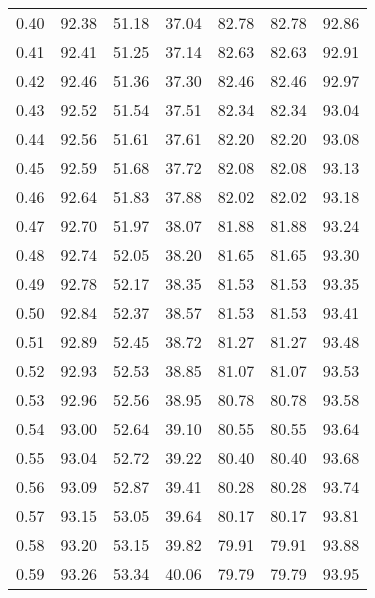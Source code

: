 \begin{tabular}{|c|c|c|c|c|c|c|}
      0.40 &     92.38 &     51.18 &      37.04 &   82.78 &      82.78 &         92.86 \\
      0.41 &     92.41 &     51.25 &      37.14 &   82.63 &      82.63 &         92.91 \\
      0.42 &     92.46 &     51.36 &      37.30 &   82.46 &      82.46 &         92.97 \\
      0.43 &     92.52 &     51.54 &      37.51 &   82.34 &      82.34 &         93.04 \\
      0.44 &     92.56 &     51.61 &      37.61 &   82.20 &      82.20 &         93.08 \\
      0.45 &     92.59 &     51.68 &      37.72 &   82.08 &      82.08 &         93.13 \\
      0.46 &     92.64 &     51.83 &      37.88 &   82.02 &      82.02 &         93.18 \\
      0.47 &     92.70 &     51.97 &      38.07 &   81.88 &      81.88 &         93.24 \\
      0.48 &     92.74 &     52.05 &      38.20 &   81.65 &      81.65 &         93.30 \\
      0.49 &     92.78 &     52.17 &      38.35 &   81.53 &      81.53 &         93.35 \\
      0.50 &     92.84 &     52.37 &      38.57 &   81.53 &      81.53 &         93.41 \\
      0.51 &     92.89 &     52.45 &      38.72 &   81.27 &      81.27 &         93.48 \\
      0.52 &     92.93 &     52.53 &      38.85 &   81.07 &      81.07 &         93.53 \\
      0.53 &     92.96 &     52.56 &      38.95 &   80.78 &      80.78 &         93.58 \\
      0.54 &     93.00 &     52.64 &      39.10 &   80.55 &      80.55 &         93.64 \\
      0.55 &     93.04 &     52.72 &      39.22 &   80.40 &      80.40 &         93.68 \\
      0.56 &     93.09 &     52.87 &      39.41 &   80.28 &      80.28 &         93.74 \\
      0.57 &     93.15 &     53.05 &      39.64 &   80.17 &      80.17 &         93.81 \\
      0.58 &     93.20 &     53.15 &      39.82 &   79.91 &      79.91 &         93.88 \\
      0.59 &     93.26 &     53.34 &      40.06 &   79.79 &      79.79 &         93.95 \\

\end{tabular}
